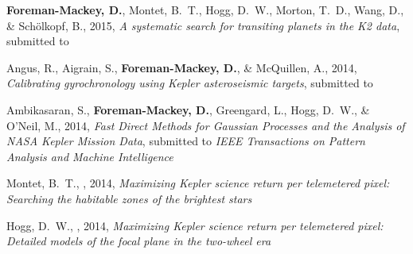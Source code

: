 \item {\bf Foreman-Mackey, D.}, Montet, B.~T., Hogg, D.~W., Morton, T.~D.,
    Wang, D., \& Sch\"olkopf, B., 2015,
    \emph{A systematic search for transiting planets in the K2 data},
    submitted to \apj\ 

\item Angus, R., Aigrain, S., {\bf Foreman-Mackey, D.}, \& McQuillen, A., 2014,
    \emph{Calibrating gyrochronology using Kepler asteroseismic targets},
    submitted to \mnras

\item Ambikasaran, S., {\bf Foreman-Mackey, D.}, Greengard, L., Hogg, D.~W.,
    \& O'Neil, M., 2014,
    \emph{Fast Direct Methods for Gaussian Processes and the Analysis of NASA
          Kepler Mission Data},
    submitted to \emph{IEEE Transactions on Pattern Analysis and Machine
        Intelligence}

\item Montet, B.~T., \etal, 2014,
    \emph{Maximizing Kepler science return per telemetered pixel: Searching
          the habitable zones of the brightest stars}

\item Hogg, D.~W., \etal, 2014,
    \emph{Maximizing Kepler science return per telemetered pixel: Detailed
          models of the focal plane in the two-wheel era}
